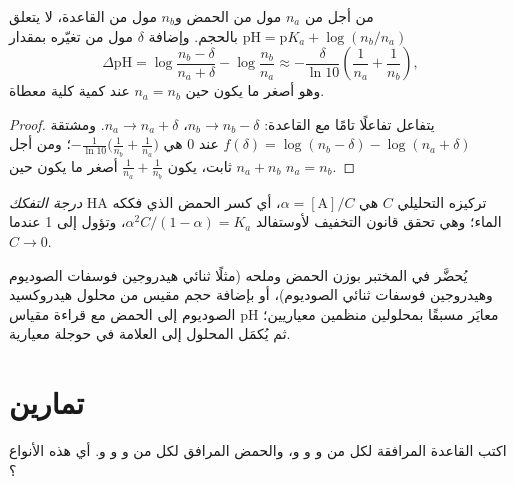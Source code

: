 \begin{proposition}\label{prop:b1:predominant-reaction:buffer}
من أجل  من $n_a$ مول من الحمض و$n_b$ مول من القاعدة، لا يتعلق $\mathrm{pH} =
\mathrm{p}K_a + \log(n_b/n_a)$ بالحجم. وإضافة
$\delta$ مول من  تغيّره بمقدار
\[
  \Delta\mathrm{pH} = \log\frac{n_b - \delta}{n_a + \delta} - \log\frac{n_b}{n_a}
  \approx -\frac{\delta}{\ln 10}\left(\frac{1}{n_a} + \frac{1}{n_b}\right),
\]
وهو أصغر ما يكون حين $n_a = n_b$ عند كمية كلية معطاة.
\end{proposition}

\begin{proof}
يتفاعل  تفاعلًا تامًا مع القاعدة: $n_b \to n_b - \delta$،
$n_a \to n_a + \delta$. ومشتقة $f(\delta) = \log(n_b - \delta) -
\log(n_a + \delta)$ عند 0 هي $-\frac{1}{\ln10}\big(\frac{1}{n_b} +
\frac{1}{n_a}\big)$؛ ومن أجل $n_a + n_b$ ثابت، يكون $\frac1{n_a} + \frac1{n_b}$
أصغر ما يكون حين $n_a = n_b$.
\end{proof}

\begin{definition}\label{def:b1:predominant-reaction:dissociation}
\emph{درجة التفكك} 
HA تركيزه التحليلي $C$ هي $\alpha = [\mathrm{A}]/C$، أي
كسر الحمض الذي فككه الماء؛ وهي تحقق قانون التخفيف لأوستفالد
$\alpha^2C/(1 - \alpha) = K_a$، وتؤول إلى 1 عندما $C \to 0$.
\end{definition}

\begin{inthelab}
يُحضَّر  في المختبر بوزن الحمض وملحه
(مثلًا ثنائي هيدروجين فوسفات الصوديوم وهيدروجين فوسفات
ثنائي الصوديوم)، أو بإضافة حجم مقيس من محلول هيدروكسيد الصوديوم
إلى الحمض مع قراءة مقياس pH معايَر مسبقًا بمحلولين
منظمين معياريين؛ ثم يُكمَل المحلول إلى العلامة في
حوجلة معيارية.
\end{inthelab}

\section{تمارين}

\begin{exercise}[$\star$]\label{exo:b1:predominant-reaction:1}
اكتب القاعدة المرافقة لكل من  و و
و، والحمض المرافق لكل من  و و
و. أي هذه الأنواع ؟
\end{exercise}

